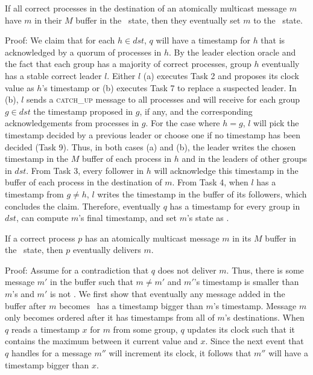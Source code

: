 \begin{lemma}
If all correct processes in the destination of an atomically multicast message $m$ have $m$ in their $M$ buffer in the \mcast\ state, then they eventually set $m$ to the \ordered\ state.
\label{lemma:X}
\end{lemma}
\noindent
{\sc Proof:} 
We claim that for each $h \in dst$, $q$ will have a timestamp for $h$ that is acknowledged by a quorum of processes in $h$.
By the leader election oracle and the fact that each group has a majority of correct processes, group $h$ eventually has a stable correct leader $l$.
Either $l$ (a) executes Task 2 and proposes its clock value as $h$'s timestamp or (b) executes Task 7 to replace a suspected leader.
In (b), $l$ sends a \textsc{catch\_up} message to all processes and will receive for each group $g \in dst$ the timestamp proposed in $g$, if any, and the corresponding acknowledgements from processes in $g$.
For the case where $h=g$, $l$ will pick the timestamp decided by a previous leader or choose one if no timestamp has been decided (Task 9).
Thus, in both cases (a) and (b), the leader writes the chosen timestamp in the $M$ buffer of each process in $h$ and in the leaders of other groups in $dst$.
From Task 3, every follower in $h$ will acknowledge this timestamp in the buffer of each process in the destination of $m$.
From Task 4, when $l$ has a timestamp from $g \neq h$, $l$ writes the timestamp in the buffer of its followers, which concludes the claim.
Therefore, eventually $q$ has a timestamp for every group in $dst$, can compute $m$'s final timestamp, and set $m$'s state as \ordered.

\begin{lemma}
If a correct process $p$ has an atomically multicast message $m$ in its $M$ buffer in the \ordered\ state, then $p$ eventually delivers $m$.
\label{lemma:Z}
\end{lemma}
\noindent
{\sc Proof:} 
Assume for a contradiction that $q$ does not deliver $m$.
Thus, there is some message $m'$ in the buffer such that $m \neq m'$ and $m'$'s timestamp is smaller than $m$'s and $m'$ is not \ordered.
We first show that eventually any message added in the buffer after $m$ becomes \ordered\ has a timestamp bigger than $m$'s timestamp.
Message $m$ only becomes ordered after it has timestamps from all of $m$'s destinations.
When $q$ reads a timestamp $x$ for $m$ from some group, $q$ updates its clock such that it contains the maximum between it current value and $x$.
Since the next event that $q$ handles for a message $m''$ will increment its clock, it follows that $m''$ will have a timestamp bigger than $x$.

